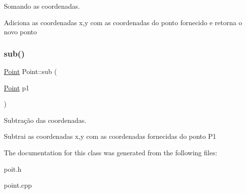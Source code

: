 Somando as coordenadas. 

Adiciona as coordenadas x,y com as coordenadas do ponto fornecido e retorna o novo ponto \mbox{\label{class_point_ab1d94b20de98b5e73345599d33145195}} 
\subsubsection{\texorpdfstring{sub()}{sub()}}
{\footnotesize\ttfamily \mbox{\hyperlink{class_point}{Point}} Point\+::sub (\begin{DoxyParamCaption}\item[{\mbox{\hyperlink{class_point}{Point}}}]{p1 }\end{DoxyParamCaption})}



Subtração das coordenadas. 

Subtrai as coordenadas x,y com as coordenadas fornecidas do ponto P1 

The documentation for this class was generated from the following files\+:\begin{DoxyCompactItemize}
\item 
poit.\+h\item 
point.\+cpp\end{DoxyCompactItemize}
